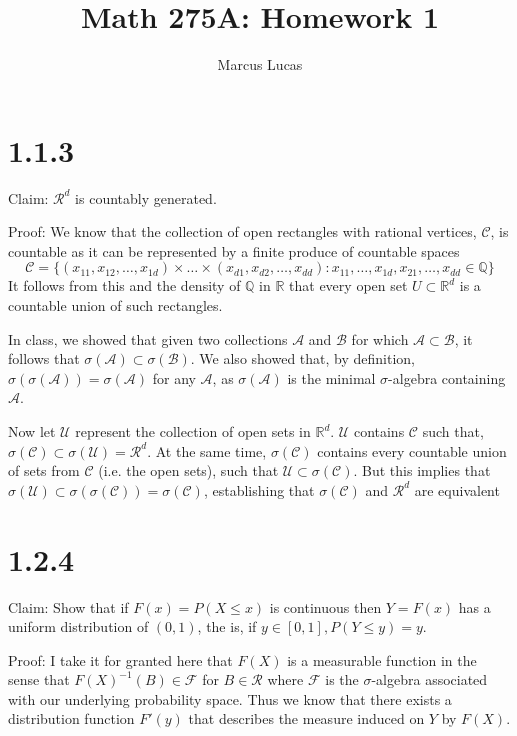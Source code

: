 \documentclass[10pt]{article}
\title{Math 275A: Homework 1}
\author{Marcus Lucas}
\date{\vspace{-1cm}}
\begin{document}
\maketitle
\section*{1.1.3}
  Claim: $\mathcal{R}^d$ is countably generated.

  Proof: We know that the collection of open rectangles with rational vertices,
  $\mathcal{C}$, is countable as it can be represented by a finite produce
  of countable spaces
  \begin{equation*}
    \mathcal{C} = \{(x_{11},x_{12}, \dots, x_{1d}) \times
    \dots \times (x_{d1},x_{d2}, \dots, x_{dd}): x_{11},\dots,x_{1d}, x_{21},
    \dots,x_{dd} \in \mathbb{Q}\}
  \end{equation*} 
  It follows from this and the density of $\mathbb{Q}$ in $\mathbb{R}$
  that every open set $U \subset \mathbb{R}^d$ is a countable union of 
  such rectangles.

  In class, we showed that given two collections $\mathcal{A}$ and $\mathcal{B}$
  for which $\mathcal{A} \subset \mathcal{B}$, it follows that
  $\sigma(\mathcal{A}) \subset \sigma(\mathcal{B})$. 
  We also showed that, by definition, 
  $\sigma(\sigma(\mathcal{A})) = \sigma(\mathcal{A})$ 
  for any $\mathcal{A}$, as $\sigma(\mathcal{A})$ is the minimal $\sigma$-algebra
  containing $\mathcal{A}$.

  Now let $\mathcal{U}$ represent the collection of open sets in $\mathbb{R}^d$.
  $\mathcal{U}$ contains $\mathcal{C}$ such that,
  $\sigma(\mathcal{C}) \subset \sigma(\mathcal{U}) = \mathcal{R}^d$.
  At the same time, $\sigma(\mathcal{C})$ contains every countable union
  of sets from $\mathcal{C}$ (i.e. the open sets), such that $\mathcal{U} \subset \sigma(\mathcal{C})$.
  But this implies that 
  $\sigma(\mathcal{U}) \subset \sigma(\sigma(\mathcal{C})) = \sigma(\mathcal{C})$,
  establishing that $\sigma(\mathcal{C})$ and $\mathcal{R}^d$
  are equivalent

\section*{1.2.4}
  Claim: Show that if $F(x) = P(X \le x)$ is continuous then $Y = F(x)$ has a
  uniform distribution of $(0,1)$, the is, if $y \in [0,1], P(Y \le y) = y$.

  Proof: I take it for granted here that $F(X)$ is 
  a measurable function in the sense that $F(X)^{-1}(B) \in \mathcal{F}$
  for $B \in \mathcal{R}$ where $\mathcal{F}$ is the $\sigma$-algebra
  associated with our underlying probability space. Thus we know that
  there exists a distribution function $F'(y)$ that describes the measure
  induced on $Y$ by $F(X)$.
\end{document}
